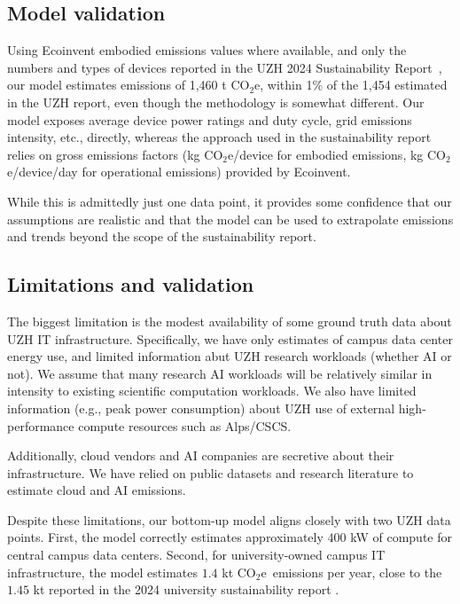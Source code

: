 \documentclass[11pt]{article}
\newcommand{\coe}{CO$_2$e}
\newcommand{\gcoe}{g \coe}
\newcommand{\kgcoe}{k\gcoe}
\begin{document}
\subsection{Model validation}

Using Ecoinvent embodied emissions values where available, and only the numbers and types of devices reported in the UZH 2024 Sustainability Report~\cite{uzh:sustainability:report}, our model estimates emissions of 1,460 t \coe, within 1\% of the 1,454 estimated in the UZH report, even though the methodology is somewhat different. Our model exposes average device power ratings and duty cycle, grid emissions intensity, etc., directly, whereas the approach used in the sustainability report relies on gross emissions factors (\kgcoe/device for embodied emissions, \kgcoe/device/day for operational emissions) provided by Ecoinvent.

While this is admittedly just one data point, it provides some confidence that our assumptions are realistic and that the model can be used to extrapolate emissions and trends beyond the scope of the sustainability report.

\subsection{Limitations and validation}

The biggest limitation is the modest availability of some ground truth data about UZH IT infrastructure. Specifically, we have only estimates of campus data center energy use, and limited information abut UZH research workloads (whether AI or not). We assume that many research AI workloads will be relatively similar in intensity to existing scientific computation workloads. We also have limited information (e.g., peak power consumption) about UZH use of external high-performance compute resources such as Alps/CSCS.

Additionally, cloud vendors and AI companies are secretive about their infrastructure. We have relied on public datasets and research literature to estimate cloud and AI emissions.

Despite these limitations, our bottom-up model aligns closely with two UZH data points. First, the model correctly estimates approximately $400$ kW of compute for central campus data centers. Second, for university-owned campus IT infrastructure, the model estimates $1.4$ kt \coe\ emissions per year, close to the $1.45$ kt reported in the 2024 university sustainability report \cite{uzh:sustainability:report}.
\end{document}
